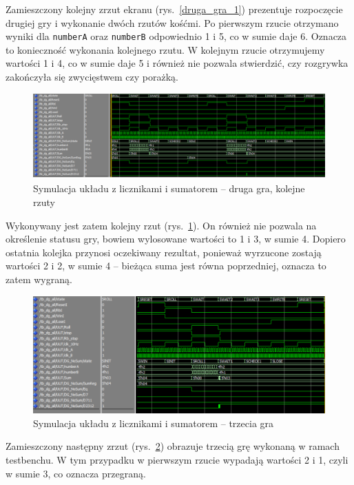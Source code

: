 \documentclass[a4paper,11pt,fleqn]{article}
\begin{document}
Zamieszczony kolejny zrzut ekranu (rys.~\ref{druga_gra_1}) prezentuje rozpoczęcie drugiej gry i wykonanie dwóch rzutów kośćmi. Po pierwszym rzucie otrzymano wyniki dla \texttt{numberA} oraz \texttt{numberB} odpowiednio 1 i 5, co w sumie daje 6. Oznacza to konieczność wykonania kolejnego rzutu. W kolejnym rzucie otrzymujemy wartości 1 i 4, co w sumie daje 5 i również nie pozwala stwierdzić, czy rozgrywka zakończyła się zwycięstwem czy porażką. 

\begin{figure}[h]
\centering
\includegraphics[scale = 0.5]{screens/druga_gra_2_win.png}
\caption{Symulacja układu z licznikami i sumatorem -- druga gra, kolejne rzuty}
\label{druga_gra_2}
\end{figure}

Wykonywany jest zatem kolejny rzut (rys.~\ref{druga_gra_2}). On również nie pozwala na określenie statusu gry, bowiem wylosowane wartości to 1 i 3, w sumie 4. Dopiero ostatnia kolejka przynosi oczekiwany rezultat, ponieważ wyrzucone zostają wartości 2 i 2, w sumie 4 -- bieżąca suma jest równa poprzedniej, oznacza to zatem wygraną.

\begin{figure}[h]
\centering
\includegraphics[scale = 0.5]{screens/trzecia_gra.png}
\caption{Symulacja układu z licznikami i sumatorem -- trzecia gra}
\label{trzecia_gra}
\end{figure}

Zamieszczony następny zrzut (rys.~\ref{trzecia_gra}) obrazuje trzecią grę wykonaną w ramach testbenchu. W tym przypadku w pierwszym rzucie wypadają wartości 2 i 1, czyli w sumie 3, co oznacza przegraną.
\end{document}
